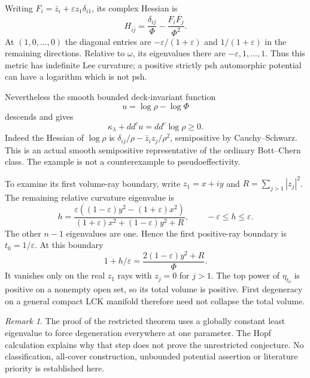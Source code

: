 \documentclass[11pt]{article}
\newcommand{\ddc}{dd^c}
\newcommand{\kap}{\kappa_\lambda}
\theoremstyle{remark}\newtheorem{remark}[theorem]{Remark}
\begin{document}
Writing $F_i=\bar z_i+\varepsilon z_1\delta_{i1}$, its complex
Hessian is
\[
 H_{i\bar j}=\frac{\delta_{ij}}\Phi-
                   \frac{F_i\overline{F_j}}{\Phi^2}.
\]
At $(1,0,\ldots,0)$ the diagonal entries are
$-\varepsilon/(1+\varepsilon)$ and $1/(1+\varepsilon)$ in the
remaining directions. Relative to $\omega$, its eigenvalues there
are $-\varepsilon,1,\ldots,1$. Thus this metric has indefinite Lee
curvature; a positive strictly psh automorphic potential can have
a logarithm which is not psh.

Nevertheless the smooth bounded deck-invariant function
\[
 u=\log\rho-\log\Phi
\]
descends and gives
\[
 \kap+\ddc u=\ddc\log\rho\geq0.
\]
Indeed the Hessian of $\log\rho$ is
$\delta_{ij}/\rho-\bar z_i z_j/\rho^2$, semipositive by
Cauchy--Schwarz. This is an actual smooth semipositive representative
of the ordinary Bott--Chern class. The example is not a
counterexample to pseudoeffectivity.

To examine its first volume-ray boundary, write $z_1=x+iy$ and
$R=\sum_{j>1}|z_j|^2$. The remaining relative curvature eigenvalue is
\[
 h=\frac{\varepsilon((1-\varepsilon)y^2-(1+\varepsilon)x^2)}
            {(1+\varepsilon)x^2+(1-\varepsilon)y^2+R},
 \qquad -\varepsilon\leq h\leq\varepsilon.
\]
The other $n-1$ eigenvalues are one. Hence the first positive-ray
boundary is $t_0=1/\varepsilon$. At this boundary
\[
 1+h/\varepsilon=
 \frac{2(1-\varepsilon)y^2+R}{\Phi}.
\]
It vanishes only on the real $z_1$ rays with $z_j=0$ for $j>1$.
The top power of $\eta_{t_0}$ is positive on a nonempty open set,
so its total volume is positive. First degeneracy on a general
compact LCK manifold therefore need not collapse the total volume.

\begin{remark}
The proof of the restricted theorem uses a globally constant least
eigenvalue to force degeneration everywhere at one parameter. The Hopf
calculation explains why that step does not prove the unrestricted
conjecture. No classification, all-cover construction, unbounded
potential assertion or literature priority is established here.
\end{remark}
\end{document}
